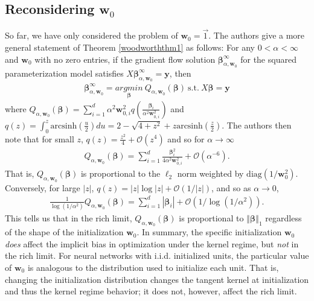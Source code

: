 \documentclass{article}
\newenvironment{manualtheorem}[1]{%
  \renewcommand\themanualtheoreminner{#1}%
  \manualtheoreminner
}{\endmanualtheoreminner}
\begin{document}
\subsection{Reconsidering $\boldsymbol{w}_0$}
So far, we have only considered the problem of $\boldsymbol{w}_0 = \vec{1}$. The authors give a more general statement of Theorem \ref{woodworththm1} as follows:
\begin{manualtheorem}{1}\label{woodworththm1_1}
For any $0 < \alpha < \infty$ and $\boldsymbol{w}_0$ with no zero entries, if the gradient flow solution $\boldsymbol{\beta}_{\alpha, \boldsymbol{w}_0}^{\infty}$ for the squared parameterization model satisfies $X\boldsymbol{\beta}_{\alpha, \boldsymbol{w}_0}^{\infty} = \boldsymbol{y}$, then 
\begin{align*}
    \boldsymbol{\beta}_{\alpha, \boldsymbol{w}_0}^{\infty} = \underset{\boldsymbol{\beta}}{argmin} \ Q_{\alpha, \boldsymbol{w}_0}(\boldsymbol{\beta}) \ \text{s.t.} \ X\boldsymbol{\beta} = \boldsymbol{y}
\end{align*}
where $Q_{\alpha, \boldsymbol{w}_0}(\boldsymbol{\beta}) = \sum_{i=1}^d \alpha^2 \boldsymbol{w}_{0,i}^2 q\left(\frac{\boldsymbol{\beta}_i}{\alpha^2\boldsymbol{w}_{0,i}^2}\right)$ and $q(z) = \int_0^z \text{arcsinh}\left(\frac{u}{2} \right) du = 2 - \sqrt{4+z^2} + z \text{arcsinh}\left(\frac{z}{2} \right).$
\end{manualtheorem}
The authors then note that for small $z$, $q(z) = \frac{z^2}{4} + \mathcal{O}(z^4)$ and so for $\alpha \rightarrow \infty$
\begin{align*}
    Q_{\alpha, \boldsymbol{w}_0}(\boldsymbol{\beta}) = \sum_{i=1}^d \frac{\boldsymbol{\beta}_i^2}{4\alpha^2\boldsymbol{w}_{0, i}^2} + \mathcal{O}(\alpha^{-6}).
\end{align*}
That is, $Q_{\alpha, \boldsymbol{w}_0}(\boldsymbol{\beta})$ is proportional to the $\ell_2$ norm weighted by $\text{diag}(1/\boldsymbol{w}_0^2)$. Conversely, for large $\left| z \right|$, $q(z) = \left|z \right| \log \left|z \right| + \mathcal{O}(1/ \left| z \right|)$, and so as $\alpha \rightarrow 0$, 
\begin{align*}
    \frac{1}{\log(1/\alpha^2)}Q_{\alpha, \boldsymbol{w}_0}(\boldsymbol{\beta}) = \sum_{i=1}^d \left| \boldsymbol{\beta}_i \right| + \mathcal{O}(1/\log(1/\alpha^2)).
\end{align*}
This tells us that in the rich limit, $Q_{\alpha, \boldsymbol{w}_0}(\boldsymbol{\beta})$ is proportional to $\left\Vert \boldsymbol{\beta} \right\Vert_1 $ regardless of the shape of the initialization $\boldsymbol{w}_0$. In summary, the specific initialization $\boldsymbol{w}_0$ \textit{does} affect the implicit bias in optimization under the kernel regime, but \textit{not} in the rich limit. For neural networks with i.i.d. initialized units, the particular value of $\boldsymbol{w}_0$ is analogous to the distribution used to initialize each unit. That is, changing the initialization distribution changes the tangent kernel at initialization and thus the kernel regime behavior; it does not, however, affect the rich limit.
\end{document}
